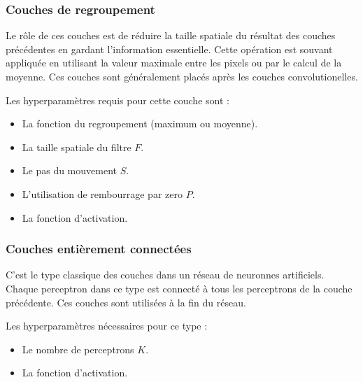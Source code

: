 \subsubsection{Couches de regroupement}

Le rôle de ces couches est de réduire la taille spatiale du résultat des couches
précédentes en gardant l'information essentielle. Cette opération est souvant
appliquée en utilisant la valeur maximale entre les pixels ou par le calcul de
la moyenne. Ces couches sont généralement placés après les couches
convolutionelles.

Les hyperparamètres requis pour cette couche sont :

\begin{itemize}
  \item La fonction du regroupement (maximum ou moyenne).
  \item La taille spatiale du filtre $F$.
  \item Le pas du mouvement $S$.
  \item L'utilisation de rembourrage par zero $P$.
  \item La fonction d'activation.
\end{itemize}

\subsubsection{Couches entièrement connectées}

C'est le type classique des couches dans un réseau de neuronnes artificiels.
Chaque perceptron dans ce type est connecté à tous les perceptrons de la couche
précédente. Ces couches sont utilisées à la fin du réseau.

Les hyperparamètres nécessaires pour ce type :

\begin{itemize}
  \item Le nombre de perceptrons $K$.
  \item La fonction d'activation.
\end{itemize}
